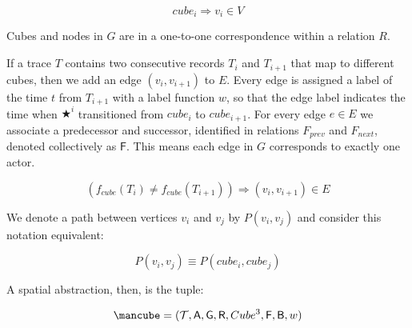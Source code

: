 \begin{equation}
  cube_i \Rightarrow v_i \in V
\end{equation}

Cubes and nodes in $G$ are in a one-to-one correspondence within a relation $R$.

If a trace $T$ contains two consecutive records $T_i$ and $T_{i+1}$ that map to different cubes, then we add an edge $(v_i, v_{i+1})$ to $E$. 
Every edge is assigned a label of the time $t$ from $T_{i+1}$ with a label function $w$, so that the edge label indicates the time when $\bigstar^i$ transitioned from $cube_i$ to $cube_{i+1}$.
For every edge $e\in E$ we associate a predecessor and successor, identified in relations $F_{prev}$ and $F_{next}$, denoted collectively as $\mathsf{F}$.
This means each edge in $G$ corresponds to exactly one actor.

\begin{equation}
  \left( f_{cube}(T_i) \neq f_{cube}(T_{i+1}) \right) \Rightarrow (v_i, v_{i+1}) \in E
\end{equation}

We denote a path between vertices $v_i$ and $v_j$ by $P(v_i, v_j)$ and consider this notation equivalent:

\begin{equation}
  P(v_i, v_j) \equiv P(cube_i, cube_j)
\end{equation}


A spatial abstraction, then, is the tuple:

\begin{equation}
\cube = (\mathcal{T}, \mathsf{A}, \mathsf{G}, \mathsf{R}, Cube^3, \mathsf{F}, \mathsf{B}, w)
\end{equation}






